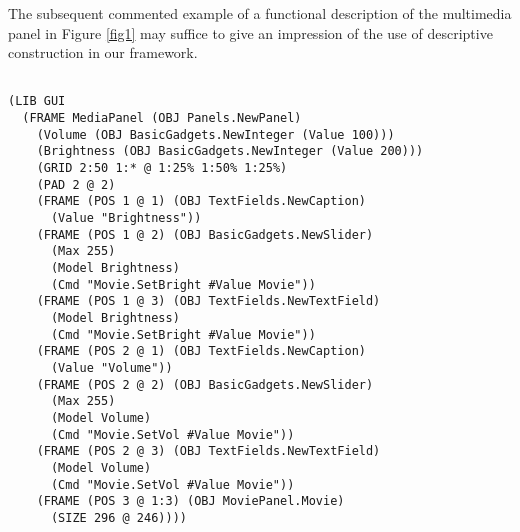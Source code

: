 \ein
The subsequent commented example of a functional description of the multimedia
panel in Figure \ref{fig1} may suffice to give an impression of the use of
descriptive construction in our framework.

{\small\begin{verbatim}

(LIB GUI
  (FRAME MediaPanel (OBJ Panels.NewPanel)
    (Volume (OBJ BasicGadgets.NewInteger (Value 100)))
    (Brightness (OBJ BasicGadgets.NewInteger (Value 200)))
    (GRID 2:50 1:* @ 1:25% 1:50% 1:25%)
    (PAD 2 @ 2)
    (FRAME (POS 1 @ 1) (OBJ TextFields.NewCaption)
      (Value "Brightness"))
    (FRAME (POS 1 @ 2) (OBJ BasicGadgets.NewSlider)
      (Max 255)
      (Model Brightness)
      (Cmd "Movie.SetBright #Value Movie"))
    (FRAME (POS 1 @ 3) (OBJ TextFields.NewTextField)
      (Model Brightness)
      (Cmd "Movie.SetBright #Value Movie"))
    (FRAME (POS 2 @ 1) (OBJ TextFields.NewCaption)
      (Value "Volume"))
    (FRAME (POS 2 @ 2) (OBJ BasicGadgets.NewSlider)
      (Max 255)
      (Model Volume)
      (Cmd "Movie.SetVol #Value Movie"))
    (FRAME (POS 2 @ 3) (OBJ TextFields.NewTextField)
      (Model Volume)
      (Cmd "Movie.SetVol #Value Movie"))
    (FRAME (POS 3 @ 1:3) (OBJ MoviePanel.Movie)
      (SIZE 296 @ 246))))

\end{verbatim}}


